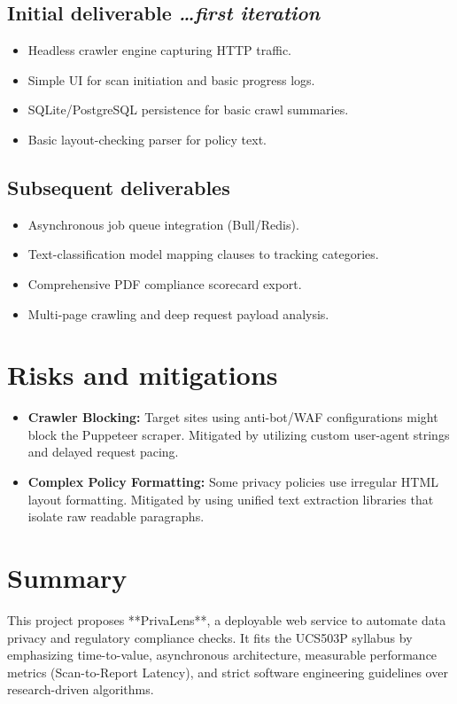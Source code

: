 \documentclass[11pt,a4paper]{article}
\newcommand{\BvrHint}[1]{{\normalfont\normalsize\itshape\hfill #1}}
\begin{document}
\subsection{Initial deliverable %
\BvrHint{\ldots first iteration}}
\begin{itemize}[leftmargin=0.7cm]
    \item Headless crawler engine capturing HTTP traffic.
    \item Simple UI for scan initiation and basic progress logs.
    \item SQLite/PostgreSQL persistence for basic crawl summaries.
    \item Basic layout-checking parser for policy text.
\end{itemize}

\subsection{Subsequent deliverables}
\begin{itemize}[leftmargin=0.7cm]
    \item Asynchronous job queue integration (Bull/Redis).
    \item Text-classification model mapping clauses to tracking categories.
    \item Comprehensive PDF compliance scorecard export.
    \item Multi-page crawling and deep request payload analysis.
\end{itemize}

\section{Risks and mitigations}
\begin{itemize}[leftmargin=0.7cm]
    \item \textbf{Crawler Blocking:} Target sites using anti-bot/WAF configurations might block the Puppeteer scraper. Mitigated by utilizing custom user-agent strings and delayed request pacing.
    \item \textbf{Complex Policy Formatting:} Some privacy policies use irregular HTML layout formatting. Mitigated by using unified text extraction libraries that isolate raw readable paragraphs.
\end{itemize}

\section{Summary}
This project proposes **PrivaLens**, a deployable web service to automate data privacy and regulatory compliance checks. It fits the UCS503P syllabus by emphasizing time-to-value, asynchronous architecture, measurable performance metrics (Scan-to-Report Latency), and strict software engineering guidelines over research-driven algorithms.
\end{document}
